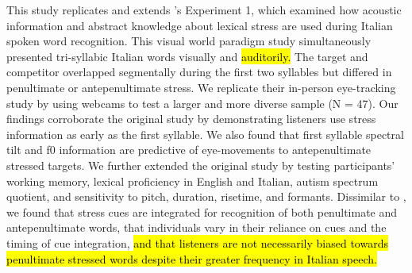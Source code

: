 This study replicates and extends \cite{Sulpizio_McQueen_2012}'s Experiment 1, which examined how acoustic information and abstract knowledge about lexical stress are used during Italian spoken word recognition. This visual world paradigm study simultaneously presented tri-syllabic Italian words visually and \hl{auditorily.} The target and competitor overlapped segmentally during the first two syllables but differed in penultimate or antepenultimate stress. We replicate their in-person eye-tracking study by using webcams to test a larger and more diverse sample (N = 47). Our findings corroborate the original study by demonstrating listeners use stress information as early as the first syllable. We also found that first syllable spectral tilt and f0 information are predictive of eye-movements to antepenultimate stressed targets. We further extended the original study by testing participants' working memory, lexical proficiency in English and Italian, autism spectrum quotient, and sensitivity to pitch, duration, risetime, and formants. Dissimilar to \cite{Sulpizio_McQueen_2012}, we found that stress cues are integrated for recognition of both penultimate and antepenultimate words, that individuals vary in their reliance on cues and the timing of cue integration, \hl{and that listeners are not necessarily biased towards penultimate stressed words despite their greater frequency in Italian speech. } 